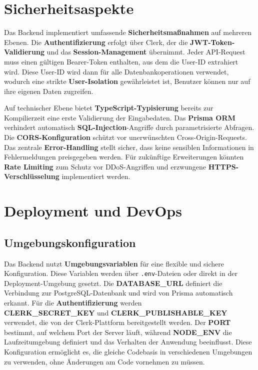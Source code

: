 \section{Sicherheitsaspekte}

Das Backend implementiert umfassende \textbf{Sicherheitsmaßnahmen} auf mehreren Ebenen. Die \textbf{Authentifizierung} erfolgt über Clerk, der die \textbf{JWT-Token-Validierung} und das \textbf{Session-Management} übernimmt. Jeder API-Request muss einen gültigen Bearer-Token enthalten, aus dem die User-ID extrahiert wird. Diese User-ID wird dann für alle Datenbankoperationen verwendet, wodurch eine strikte \textbf{User-Isolation} gewährleistet ist, Benutzer können nur auf ihre eigenen Daten zugreifen.

Auf technischer Ebene bietet \textbf{TypeScript-Typisierung} bereits zur Kompilierzeit eine erste Validierung der Eingabedaten. Das \textbf{Prisma ORM} verhindert automatisch \textbf{SQL-Injection}-Angriffe durch parametrisierte Abfragen. Die \textbf{CORS-Konfiguration} schützt vor unerwünschten Cross-Origin-Requests. Das zentrale \textbf{Error-Handling} stellt sicher, dass keine sensiblen Informationen in Fehlermeldungen preisgegeben werden. Für zukünftige Erweiterungen könnten \textbf{Rate Limiting} zum Schutz vor DDoS-Angriffen und erzwungene \textbf{HTTPS-Verschlüsselung} implementiert werden.

\section{Deployment und DevOps}

\subsection{Umgebungskonfiguration}

Das Backend nutzt \textbf{Umgebungsvariablen} für eine flexible und sichere Konfiguration. Diese Variablen werden über \texttt{.env}-Dateien oder direkt in der Deployment-Umgebung gesetzt. Die \textbf{DATABASE\_URL} definiert die Verbindung zur PostgreSQL-Datenbank und wird von Prisma automatisch erkannt. Für die \textbf{Authentifizierung} werden\\ \textbf{CLERK\_SECRET\_KEY} und \textbf{CLERK\_PUBLISHABLE\_KEY} verwendet, die von der Clerk-Plattform bereitgestellt werden. Der \textbf{PORT} bestimmt, auf welchem Port der Server läuft, während \textbf{NODE\_ENV} die Laufzeitumgebung definiert und das Verhalten der Anwendung beeinflusst. Diese Konfiguration ermöglicht es, die gleiche Codebasis in verschiedenen Umgebungen zu verwenden, ohne Änderungen am Code vornehmen zu müssen.

